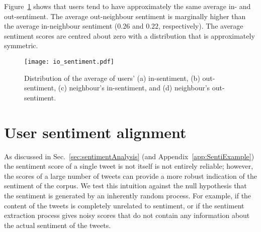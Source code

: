 \documentclass{article}
\begin{document}
Figure~\ref{fig:sen_inout} shows that users tend to have approximately
the same average in- and out-sentiment. The average out-neighbour
sentiment is marginally higher than the average in-neighbour sentiment
($0.26$ and $0.22$, respectively). The average sentiment scores are
centred about zero with a distribution that is approximately
symmetric.

\begin{figure}[p]
  \centering
   \texttt{[image: io\_sentiment.pdf]}
  \caption{Distribution of the average of users' (a) in-sentiment, (b)
    out-sentiment, (c) neighbour's in-sentiment, and (d) neighbour's
    out-sentiment.}\label{fig:sen_inout}
\end{figure}

\section{User sentiment alignment}
\label{sec:testingRel}


As discussed in Sec.~\ref{sec:sentimentAnalysis} (and
Appendix~\ref{app:SentiExample}) the sentiment score of a single tweet
is not itself is not entirely reliable; however, the scores of a large
number of tweets can provide a more robust indication of the sentiment
of the corpus. We test this intuition against the null hypothesis that
the sentiment is generated by an inherently random process. 
For example, if the content of the tweets is completely
unrelated to sentiment, or if the sentiment extraction process gives
noisy scores that do not contain any information about the actual
sentiment of the tweets.
\end{document}
